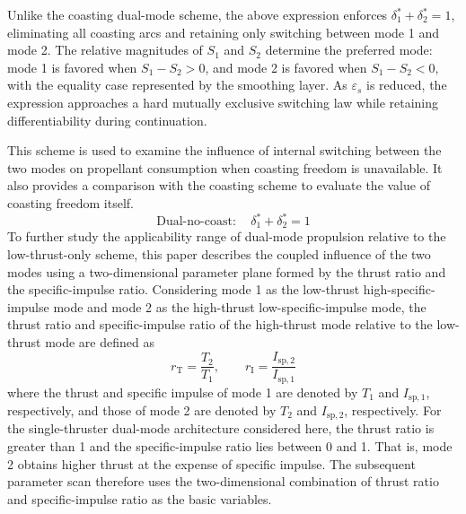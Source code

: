 ﻿\documentclass{IEEEtaes}
\begin{document}
Unlike the coasting dual-mode scheme, the above expression enforces $\delta_1^{*}+\delta_2^{*}=1$, eliminating all coasting arcs and retaining only switching between mode 1 and mode 2. The relative magnitudes of $S_1$ and $S_2$ determine the preferred mode: mode 1 is favored when $S_1-S_2>0$, and mode 2 is favored when $S_1-S_2<0$, with the equality case represented by the smoothing layer. As $\varepsilon_s$ is reduced, the expression approaches a hard mutually exclusive switching law while retaining differentiability during continuation.

This scheme is used to examine the influence of internal switching between the two modes on propellant consumption when coasting freedom is unavailable. It also provides a comparison with the coasting scheme to evaluate the value of coasting freedom itself.
\begin{equation}
\text{Dual-no-coast}:\quad \delta_1^{*}+\delta_2^{*}=1
\end{equation}
To further study the applicability range of dual-mode propulsion relative to the low-thrust-only scheme, this paper describes the coupled influence of the two modes using a two-dimensional parameter plane formed by the thrust ratio and the specific-impulse ratio. Considering mode 1 as the low-thrust high-specific-impulse mode and mode 2 as the high-thrust low-specific-impulse mode, the thrust ratio and specific-impulse ratio of the high-thrust mode relative to the low-thrust mode are defined as
\begin{equation}
r_{\mathrm{T}}=\frac{T_2}{T_1},\qquad r_{\mathrm{I}}=\frac{I_{\mathrm{sp},2}}{I_{\mathrm{sp},1}}
\end{equation}
where the thrust and specific impulse of mode 1 are denoted by $T_1$ and $I_{\mathrm{sp},1}$, respectively, and those of mode 2 are denoted by $T_2$ and $I_{\mathrm{sp},2}$, respectively. For the single-thruster dual-mode architecture considered here, the thrust ratio is greater than 1 and the specific-impulse ratio lies between 0 and 1. That is, mode 2 obtains higher thrust at the expense of specific impulse. The subsequent parameter scan therefore uses the two-dimensional combination of thrust ratio and specific-impulse ratio as the basic variables.
\end{document}
